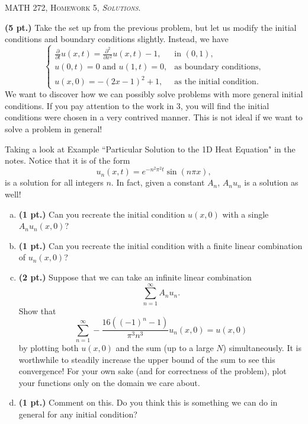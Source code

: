 \documentclass[12pt]{article} %
\begin{document}
\begin{center}
   \textsc{\large MATH 272, Homework 5, \emph{Solutions}.}
\end{center}
\vspace{.5cm}

\begin{problem}
\textbf{(5 pt.)} Take the set up from the previous problem, but let us modify the initial conditions and boundary conditions slightly. Instead, we have
\[
\begin{cases}
\frac{\partial}{\partial t} u(x,t) = \frac{\partial^2}{\partial x^2} u(x,t) - 1, & \textrm{in $(0,1)$},\\
u(0,t)=0 \textrm{~and~} u(1,t)=0, & \text{as boundary conditions},\\
u(x,0) = -(2x-1)^2+1, & \textrm{as the initial condition}.
\end{cases}
\]
We want to discover how we can possibly solve problems with more general initial conditions. If you pay attention to the work in 3, you will find the initial conditions were chosen in a very contrived manner. This is not ideal if we want to solve a problem in general!

Taking a look at Example ``Particular Solution to the 1D Heat Equation" in the notes. Notice that it is of the form
\[
u_n(x,t) = e^{-n^2\pi^2 t} \sin(n \pi x),
\]
is a solution for all integers $n$. In fact, given a constant $A_n$, $A_n u_n$ is a solution as well!
\begin{enumerate}[(a)]
    \item \textbf{(1 pt.)} Can you recreate the initial condition $u(x,0)$ with a single $A_n u_n(x,0)$?
    \item \textbf{(1 pt.)} Can you recreate the initial condition with a finite linear combination of $u_n(x,0)$?
    \item \textbf{(2 pt.)} Suppose that we can take an infinite linear combination
    \[
    \sum_{n=1}^\infty A_n u_n.
    \]
    Show that
    \[
    \sum_{n=1}^\infty -\frac{16\left(\left(-1\right)^{n}-1\right)}{\pi^{3}n^{3}}u_n(x,0) = u(x,0)
    \]
    by plotting both $u(x,0)$ and the sum (up to a large $N$) simultaneously. It is worthwhile to steadily increase the upper bound of the sum to see this convergence! For your own sake (and for correctness of the problem), plot your functions only on the domain we care about.
    \item \textbf{(1 pt.)} Comment on this. Do you think this is something we can do in general for any initial condition?
\end{enumerate}
\end{problem}
\end{document}
